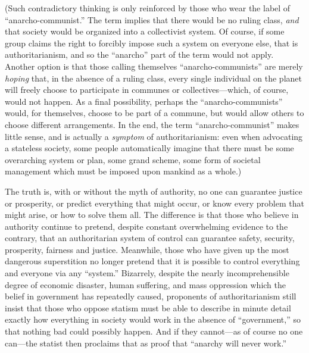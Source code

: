 \documentclass{book}
\begin{document}
(Such contradictory thinking is only reinforced by those who wear the label of \enquote{anarcho-communist.} The term implies that there would be no ruling class, \emph{and} that society would be organized into a collectivist system. Of course, if some group claims the right to forcibly impose such a system on everyone else, that is authoritarianism, and so the \enquote{anarcho} part of the term would not apply. Another option is that those calling themselves \enquote{anarcho-communists} are merely \emph{hoping} that, in the absence of a ruling class, every single individual on the planet will freely choose to participate in communes or collectives---which, of course, would not happen. As a final possibility, perhaps the \enquote{anarcho-communists} would, for themselves, choose to be part of a commune, but would allow others to choose different arrangements. In the end, the term \enquote{anarcho-communist} makes little sense, and is actually a \emph{symptom} of authoritarianism: even when advocating a stateless society, some people automatically imagine that there must be some overarching system or plan, some grand scheme, some form of societal management which must be imposed upon mankind as a whole.)

The truth is, with or without the myth of authority, no one can guarantee justice or prosperity, or predict everything that might occur, or know every problem that might arise, or how to solve them all. The difference is that those who believe in authority continue to pretend, despite constant overwhelming evidence to the contrary, that an authoritarian system of control can guarantee safety, security, prosperity, fairness and justice. Meanwhile, those who have given up the most dangerous superstition no longer pretend that it is possible to control everything and everyone via any \enquote{system.} Bizarrely, despite the nearly incomprehensible degree of economic disaster, human suffering, and mass oppression which the belief in government has repeatedly caused, proponents of authoritarianism still insist that those who oppose statism must be able to describe in minute detail exactly how everything in society would work in the absence of \enquote{government,} so that nothing bad could possibly happen. And if they cannot---as of course no one can---the statist then proclaims that as proof that \enquote{anarchy will never work.}
\end{document}
